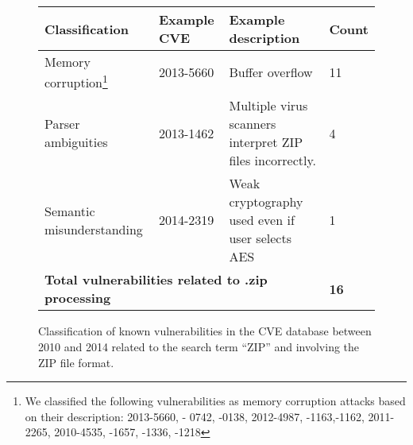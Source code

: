 \begin{figure*}
\centering
\begin{tabular}{llll}
\toprule
 \bf Classification & \bf Example CVE & \bf Example description & \bf Count\\
\midrule
  Memory corruption\footnote{We classified the following vulnerabilities as memory corruption
    attacks based on their description: 2013-5660, - 0742, -0138, 2012-4987, -1163,-1162, 2011-2265,
    2010-4535, -1657, -1336, -1218} & 2013-5660 & Buffer overflow & 11\\
  Parser ambiguities & 2013-1462 & Multiple virus scanners interpret ZIP files incorrectly.& 4\\
  Semantic misunderstanding & 2014-2319 & Weak cryptography used even if user selects AES & 1\\
  \multicolumn{3}{l}{\bf Total vulnerabilities related to .zip processing }& \bf 16  \\
\bottomrule
  
\end{tabular}
\caption{Classification of known vulnerabilities in the CVE database
between 2010 and 2014 related to the search term ``ZIP'' and involving
the ZIP file format.}
\label{fig:motivation} 
\end{figure*}
